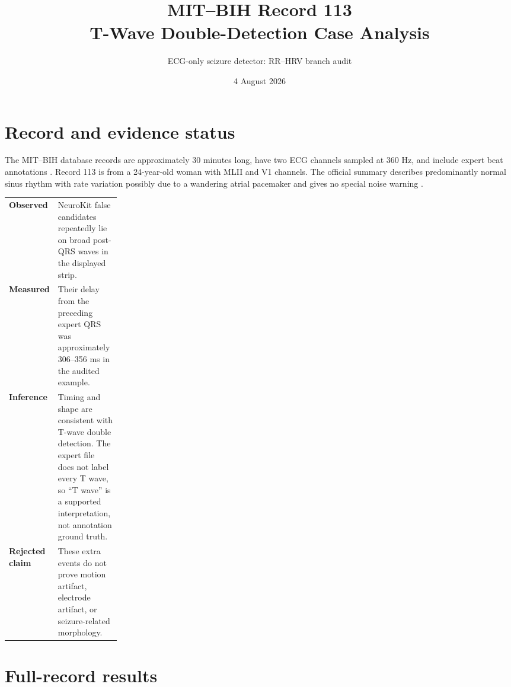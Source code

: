 \documentclass[10pt]{article}
\title{MIT--BIH Record 113\\T-Wave Double-Detection Case Analysis}
\author{ECG-only seizure detector: RR--HRV branch audit}
\date{4 August 2026}
\begin{document}
\maketitle


\section{Record and evidence status}
The MIT--BIH database records are approximately 30 minutes long, have two ECG channels sampled at 360 Hz, and include expert beat annotations \cite{moody2001mitbih,physionetmitdb,goldberger2000physiobank}. Record 113 is from a 24-year-old woman with MLII and V1 channels. The official summary describes predominantly normal sinus rhythm with rate variation possibly due to a wandering atrial pacemaker and gives no special noise warning \cite{physionetmitdb}.

\begin{tabularx}{\linewidth}{@{}>{\bfseries}p{0.22\linewidth}X@{}}
Observed & NeuroKit false candidates repeatedly lie on broad post-QRS waves in the displayed strip.\\
Measured & Their delay from the preceding expert QRS was approximately 306--356 ms in the audited example.\\
Inference & Timing and shape are consistent with T-wave double detection. The expert file does not label every T wave, so ``T wave'' is a supported interpretation, not annotation ground truth.\\
Rejected claim & These extra events do not prove motion artifact, electrode artifact, or seizure-related morphology.\\
\end{tabularx}

\section{Full-record results}
\metricdef\ \provenance
\end{document}
